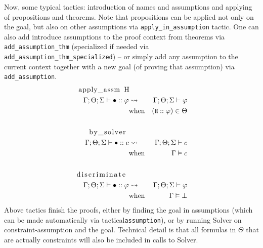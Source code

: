\documentclass[english, mgr]{iithesis}
\renewcommand{\tt}[1]{\texttt{\small{#1}}}
\begin{document}
Now, some typical tactics: introduction of names and assumptions and applying of
propositions and theorems.
Note that propositions can be applied not only on the goal, but also on other
assumptions via \tt{apply\_in\_assumption} tactic.
One can also add introduce assumptions to the proof context from theorems via \tt{add\_assumption\_thm}
(specialized if needed via \tt{add\_assumption\_thm\_specialized}) --
or simply add any assumption to the current context together with a new goal (of proving that assumption)
via \tt{add\_assumption}.
\begin{eqnarray*}  \text{\lstinline[columns=fixed]{apply_assm H}} & & \\
    \jgmnt[\Gamma; \Theta; \Sigma]{\hole\ofkind{{\formphi}}} & \leadsto & \jgmnt[\Gamma; \Theta; \Sigma]{\formphi} \\
   & \text{when} & (\tt{H} \ofkind {\formphi }) \in \Theta \\
  & & \\
  \text{\lstinline[columns=fixed]{by_solver} }& & \\
  \jgmnt[\Gamma; \Theta; \Sigma]{\hole\ofkind{{\constr}}} & \leadsto & \jgmnt[\Gamma; \Theta; \Sigma]{\constr} \\
   & \text{when} & \cjgmnt[\Gamma]{\constr}\\
  & & \\
  \text{\lstinline[columns=fixed]{discriminate} }& & \\
  \jgmnt[\Gamma; \Theta; \Sigma]{\hole\ofkind{{\formphi}}} & \leadsto & \jgmnt[\Gamma; \Theta; \Sigma]{\formphi} \\
   & \text{when} & \cjgmnt[\Gamma]{\bot}
  \end{eqnarray*}
Above tactics finish the proofs, either by finding the goal in assumptions
(which can be made automatically via tactical\tt{assumption}),
or by running Solver on constraint-assumption and the goal.
Technical detail is that all formulas in $\Theta$ that are actually constraints
will also be included in calls to Solver.
\end{document}
